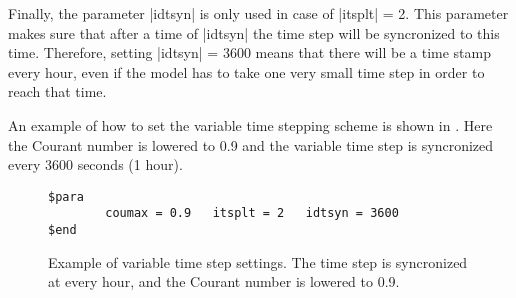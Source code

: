 Finally, the parameter |idtsyn| is only used in case of |itsplt| = 2. 
This parameter makes sure that
               after a time of |idtsyn| the time step will be syncronized
               to this time. Therefore, setting |idtsyn| = 3600 means
               that there will be a time stamp every hour, even if the model
               has to take one very small time step in order to reach that
               time.

An example of how to set the variable time stepping scheme is shown
in \Fig{}. Here the Courant number is lowered to 0.9 and
the variable time step is syncronized every 3600 seconds (1 hour).

\begin{figure}[ht]
\begin{verbatim}
$para
        coumax = 0.9   itsplt = 2   idtsyn = 3600
$end
\end{verbatim}
\caption{Example of variable time step settings. The time step is syncronized
at every hour, and the Courant number is lowered to 0.9.}
\label{fig:vartime}
\end{figure}

